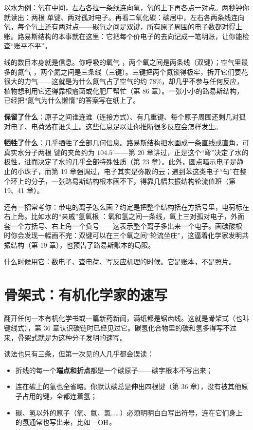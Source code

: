 以水为例：氧在中间，左右各拉一条线连向氢，氧的上下再各点一对点。两秒钟你就读出：两根  单键、两对孤对电子。再看二氧化碳：碳居中，左右各两条线连向氧，每个氧上还有两对点——碳氧之间是双键，所有原子周围的电子数都对得上账。路易斯结构的本事就在这里：它把每个价电子的去向记成一笔明账，让你能检查“账平不平”。

线的数目本身就是信息。你呼吸的氧气 ，两个氧之间是两条线（双键）；空气里最多的氮气 ，两个氮之间是三条线（三键）。三键把两个氮锁得极牢，拆开它们要花很大的力气——这就是为什么氮气占了空气的约 $78\%$，却几乎不参与任何反应，植物想利用它还得靠根瘤菌或化肥厂帮忙（第 86 章）。一张小小的路易斯结构，已经把“氮气为什么懒惰”的答案写在纸上了。

\textbf{保留了什么}：原子之间谁连谁（连接方式）、有几重键、每个原子周围还剩几对孤对电子、电荷落在谁头上。这些信息足以让你推断很多反应会怎样发生。

\textbf{牺牲了什么}：几乎牺牲了全部几何信息。路易斯结构把水画成一条直线或直角，可真实水分子两根  键的夹角约为 $104.5^{\circ}$——第 20 章讲过，正是这个“弯”决定了水的极性，进而决定了水的几乎全部特殊性质（第 23 章）。此外，圆点暗示电子是静止的小珠子，而第 19 章强调过，电子其实是弥散的云；遇到苯这类电子“匀”在整个环上的分子，一张路易斯结构根本画不下，得靠几幅共振结构轮流值班（第 19、41 章）。

还有一招常考你：带电的离子怎么画？约定是把整个结构括在方括号里，电荷标在右上角。比如水的“亲戚”氢氧根 ：氧和氢之间一条线，氧上三对孤对电子，外面套一个方括号、右上角一个负号——这表示整个离子多出来一个电子。画碳酸根  时你会发现一幅画不完：双键可以在三个氧之间“轮流坐庄”，这逼着化学家发明共振结构（第 19 章），也预告了路易斯账本的局限。

什么时候用它：数电子、查电荷、写反应机理的时候。它是账本，不是照片。

\section{骨架式：有机化学家的速写}

翻开任何一本有机化学书或一篇新药新闻，满纸都是锯齿线。这就是骨架式（也叫键线式），第 36 章认识碳链时已经见过它。碳氢化合物里的碳和氢多得写不过来，骨架式就是为这种分子发明的速写。

读法也只有三条，但第一次见的人几乎都会误读：

\begin{itemize}[itemsep=2pt]
\item 折线的每一个\textbf{端点和折点}都是一个碳原子——碳字根本不写出来；
\item 连在碳上的氢也全省略。你默认碳总是伸出四根键（第 36 章），没有被其他原子占用的键，全都连着氢；
\item 碳、氢以外的原子（氧、氮、氯……）必须明明白白写出符号，连在它们身上的氢通常也写出来，比如 $-\mathrm{OH}$。
\end{itemize}

